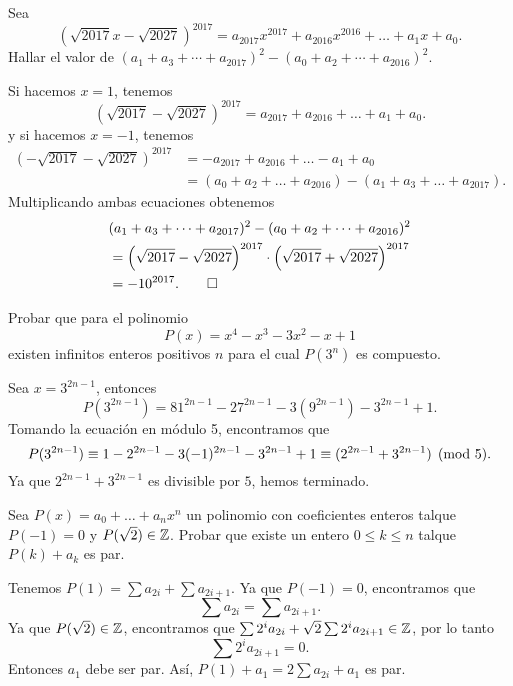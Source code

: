 \begin{example}
    Sea
    \[
        \left(\sqrt {2017} x - \sqrt {2027}\right)^{2017} = a_{2017} x^{2017} + a_{2016} x^{2016} + \ldots + a_1 x + a_0.
    \]
    Hallar el valor de $(a_1 + a_3 + \cdots + a_{2017})^2 - (a_0 + a_2 + \cdots + a_{2016})^2.$
\end{example}
\begin{solution}
    Si hacemos $x = 1$, tenemos
    \[
        \left(\sqrt {2017} - \sqrt {2027}\right)^{2017} = a_{2017} + a_{2016} + \ldots + a_1 + a_0.
    \]
    y si hacemos $x = -1$, tenemos
    \begin{align*}
        \left(-\sqrt {2017} - \sqrt {2027}\right)^{2017} &= -a_{2017} + a_{2016} + \ldots - a_1 + a_0\\
        &= (a_0 + a_2 + \ldots + a_{2016}) - (a_1 + a_3 + \ldots + a_{2017}).
    \end{align*}
    Multiplicando ambas ecuaciones obtenemos
    \begin{align*}
    &(a_1 + a_3 + \cdots + a_{2017})^2 - (a_0 + a_2 + \cdots + a_{2016})^2\\
    &= \left(\sqrt {2017} - \sqrt {2027}\right)^{2017} \cdot \left(\sqrt {2017} + \sqrt {2027}\right)^{2017}\\
    &= -10^{2017}. \qedhere
    \end{align*}
\end{solution}

\begin{example}
    Probar que para el polinomio
    \[
        P(x) = x^4 - x^3 - 3x^2 - x + 1
    \]
    existen infinitos enteros positivos $n$ para el cual $P(3^n)$ es compuesto.
\end{example}
\begin{solution}
    Sea $x = 3^{2n - 1}$, entonces
    \[
        P(3^{2n - 1}) = 81^{2n - 1} - 27^{2n - 1} - 3 (9^{2n - 1}) - 3^{2n - 1} + 1.
    \]
    Tomando la ecuación en módulo 5, encontramos que
    \[
        P(3^{2n - 1}) \equiv 1 - 2^{2n - 1} - 3(- 1)^{2n - 1} - 3^{2n - 1} + 1 \equiv (2^{2n - 1} + 3^{2n - 1}) \pmod{5}.
    \]
    Ya que $2^{2n - 1} + 3^{2n - 1}$ es divisible por $5$, hemos terminado.
\end{solution}

\begin{example}
    Sea $P(x) = a_0 + \ldots + a_n x^n$ un polinomio con coeficientes enteros talque $P(-1) = 0$ y $P(\sqrt {2}) \in \mathbb{Z}$.
    Probar que existe un entero $0 \leq k \leq n$ talque $P(k) + a_k$ es par.
\end{example}
\begin{solution}
    Tenemos $P(1) = \sum a_{2i} + \sum a_{2i + 1}.$
    Ya que $P(-1) = 0$, encontramos que
    \[
        \sum a_{2i} = \sum a_{2i + 1}.
    \]
    Ya que $P(\sqrt {2}) \in \mathbb{Z}$, encontramos que $\sum 2^i a_{2i} + \sqrt {2} \sum 2^i a_{2i + 1} \in \mathbb{Z}$, por lo tanto
    \[
        \sum 2^i a_{2i + 1} = 0.
    \]
    Entonces $a_1$ debe ser par.
    Así, $P(1) + a_1 = 2 \sum a_{2i} + a_1$ es par.
\end{solution}


